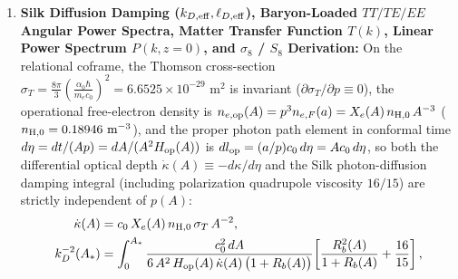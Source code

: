 \documentclass[11pt,a4paper]{article}
\newcommand{\RefG}{\mathrm{RefG}}
\begin{document}
\begin{enumerate}[label=\arabic*.]
Simultaneously, the cold phase source density relative to radiation during BBN is $\hat{\rho}_{C,\rm op}/\hat{\rho}_{r,\rm op} = (\Omega_{C0}/\Omega_{r0})A = 8.44\times 10^{-7}$ at $T = 0.80\text{ MeV}$ and $8.66\times 10^{-6}$ at $T_{\rm nuc} = 0.07792\text{ MeV}$, contributing zero extra relativistic degrees of freedom (\textbf{$\Delta N_{\rm eff}^{\rm RefG} \equiv 0$}, $N_{\rm eff} = 3.044$). Integrating the three-channel relativistic weak rate ($\Gamma_{n\to p} = \Gamma_{n+\nu_e\to p+e^-} + \Gamma_{n+e^+\to p+\bar{\nu}_e} + \Gamma_{n\to p+e^-+\bar{\nu}_e}$) with exact $e^+e^-$ entropy transfer $T_\nu / T_\gamma = [(4 + 7 f_{ee}(T_\gamma))/11]^{1/3}$, the $\RefG$-derived neutron lifetime $\tau_n^{\rm RefG} = 879.9\text{ s}$, and $\eta_{10} = 273.9\,\omega_b = 6.1230$ yields $X_n^{\rm freeze} = 0.15590$, deuterium bottleneck temperature $T_{\rm nuc} = 0.07792\text{ MeV}$ ($t_{\rm nuc} = 210.15\text{ s}$, $X_n(T_{\rm nuc}) = 0.12278$), primordial Helium-4 mass fraction \textbf{$Y_p^{\rm RefG} = 2 X_n(T_{\rm nuc}) = 0.2456$} (matching PDG 2024 $Y_p^{\rm obs} = 0.245 \pm 0.003$ to $0.19\sigma$), and primordial deuterium abundance \textbf{$(\mathrm{D/H})_p^{\rm RefG} = 2.512\times 10^{-5}$} (matching PDG 2024 $(2.547 \pm 0.025)\times 10^{-5}$ to $1.38\sigma$).
\item \textbf{Silk Diffusion Damping ($k_{D,\rm eff}, \ell_{D,\rm eff}$), Baryon-Loaded $TT/TE/EE$ Angular Power Spectra, Matter Transfer Function $T(k)$, Linear Power Spectrum $P(k, z=0)$, and $\sigma_8$ / $S_8$ Derivation:} On the relational coframe, the Thomson cross-section $\sigma_T = \frac{8\pi}{3}(\frac{\alpha_0\hbar}{m_e c_0})^2 = 6.6525\times 10^{-29}\text{ m}^2$ is invariant ($\partial\sigma_T/\partial p \equiv 0$), the operational free-electron density is $n_{e,\rm op}(A) = p^3 n_{e,F}(a) = X_e(A)\,n_{\rm H,0}\,A^{-3}$ ($n_{\rm H,0} = 0.18946\text{ m}^{-3}$), and the proper photon path element in conformal time $d\eta = dt/(A p) = dA/(A^2 H_{\rm op}(A))$ is $dl_{\rm op} = (a/p)c_0\,d\eta = A c_0\,d\eta$, so both the differential optical depth $\dot{\kappa}(A) \equiv -d\kappa/d\eta$ and the Silk photon-diffusion damping integral (including polarization quadrupole viscosity $16/15$) are strictly independent of $p(A)$:
\begin{align}
\dot{\kappa}(A) &= c_0\,X_e(A)\,n_{\rm H,0}\,\sigma_T\,A^{-2}, \nonumber\\
k_D^{-2}(A_*) &= \int_0^{A_*} \frac{c_0^2\,dA}{6\,A^2\,H_{\rm op}(A)\,\dot{\kappa}(A)\,\bigl(1 + R_b(A)\bigr)}\!\left[\frac{R_b^2(A)}{1 + R_b(A)} + \frac{16}{15}\right], \nonumber\\

\end{align}
\end{enumerate}
\end{document}
